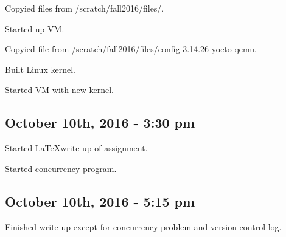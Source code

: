 \documentclass[letterpaper,10pt]{article}
\begin{document}
Copyied files from /scratch/fall2016/files/.

Started up VM.

Copyied file from /scratch/fall2016/files/config-3.14.26-yocto-qemu.

Built Linux kernel.

Started VM with new kernel.
\subsection{October 10th, 2016 - 3:30 pm}
Started \LaTeX write-up of assignment.

Started concurrency program.
\subsection{October 10th, 2016 - 5:15 pm}
Finished write up except for concurrency problem and version control log.
\end{document}

